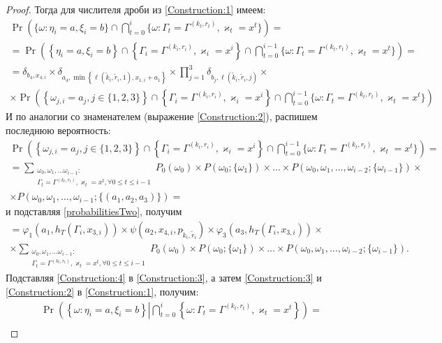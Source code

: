 \documentclass[a4paper,12pt,russian]{extarticle}
\newcommand{\ml}[1]{\begin{multline}#1\end{multline}}
\newcommand{\mll}[1]{\begin{multline*}#1\end{multline*}}
\begin{document}
\begin{proof}
Тогда для числителя дроби из \eqref{Construction:1} имеем:
\ml
{
\Pr\left(\{ \omega \colon \eta_i = a, \xi_i=b \} \cap \bigcap_{t=0}^{i}\{\omega\colon \Gamma_t=\Gamma^{(k_t,r_t)}, \varkappa_t=x^t\}\right)=\\
= \Pr\left(\left\{ \eta_i = a, \xi_i=b \right\} \cap \left\{\Gamma_i=\Gamma^{(k_i,r_i)}, \varkappa_i=x^i\right\} \cap \bigcap_{t=0}^{i-1}\{\omega\colon \Gamma_t=\Gamma^{(k_t,r_t)}, \varkappa_t=x^t\}\right)=\\
= \delta_{b_4,x_{4,i}} \times \delta_{a_4,\min\left\{\ell(\tilde{k}_i,\tilde{r}_i,1), x_{1,i}+a_1\right\}} \times \prod_{j=1}^3\delta_{b_j,\ell(\tilde{k}_i,\tilde{r}_i,j)}   \times \\
\times \Pr\left( \left\{ \omega_{j,i} = a_j, j\in \{1, 2, 3\}\right\} \cap \left\{\Gamma_i=\Gamma^{(k_i,r_i)}, \varkappa_i=x^i\right\} \cap \bigcap_{t=0}^{i-1}\{\omega\colon \Gamma_t=\Gamma^{(k_t,r_t)}, \varkappa_t=x^t\}\right)
\label{Construction:3}
}
И по аналогии со знаменателем (выражение \eqref{Construction:2}), распишем последнюю вероятность:
\mll
{
\Pr\left( \left\{ \omega_{j,i} = a_j, j\in \{1, 2, 3\}\right\} \cap \left\{\Gamma_i=\Gamma^{(k_i,r_i)}, \varkappa_i=x^i\right\} \cap \bigcap_{t=0}^{i-1}\{\omega\colon \Gamma_t=\Gamma^{(k_t,r_t)}, \varkappa_t=x^t\}\right) =\\
= \sum_{\substack{\omega_0, \omega_1,\ldots \omega_{i-1} \colon \\ \Gamma_t=\Gamma^{(k_t,r_t)}, \varkappa_t=x^t, \forall 0\leqslant t \leqslant i-1}} P_0(\omega_0)\times P(\omega_0;\{\omega_1\})\times\ldots\times P(\omega_0,\omega_1,\ldots, \omega_{i-2};\{\omega_{i-1}\})\times\\
\times  P(\omega_0,\omega_1,\ldots, \omega_{i-1};\{(a_1, a_2, a_3)\}) =
}
и подставляя \eqref{probabilitiesTwo}, получим
\ml
{
=\varphi_1(a_1,h_T(\Gamma_i,x_{3,i})) \times \psi(a_2,x_{4,i}, p_{\tilde{k}_i,\tilde{r}_i}) \times \varphi_3(a_3,h_T(\Gamma_i,x_{3,i})) \times \\ 
\times \sum_{\substack{\omega_0, \omega_1,\ldots \omega_{i-1} \colon \\ \Gamma_t=\Gamma^{(k_t,r_t)}, \varkappa_t=x^t, \forall 0\leqslant t \leqslant i-1}} P_0(\omega_0)\times P(\omega_0;\{\omega_1\})\times\ldots\times P(\omega_0,\omega_1,\ldots, \omega_{i-2};\{\omega_{i-1}\}).
\label{Construction:4}
}
Подставляя  \eqref{Construction:4} в \eqref{Construction:3}, а затем \eqref{Construction:3} и \eqref{Construction:2} в \eqref{Construction:1}, получим:
\mll
{
\Pr \left(\left\{ \omega \colon \eta_i = a, \xi_i=b\right\}  \left| \bigcap_{t=0}^{i}\left\{\omega\colon \Gamma_t=\Gamma^{(k_t,r_t)}, \varkappa_t=x^t\right\}\right.\right)  = \\
}
\end{proof}
\end{document}
